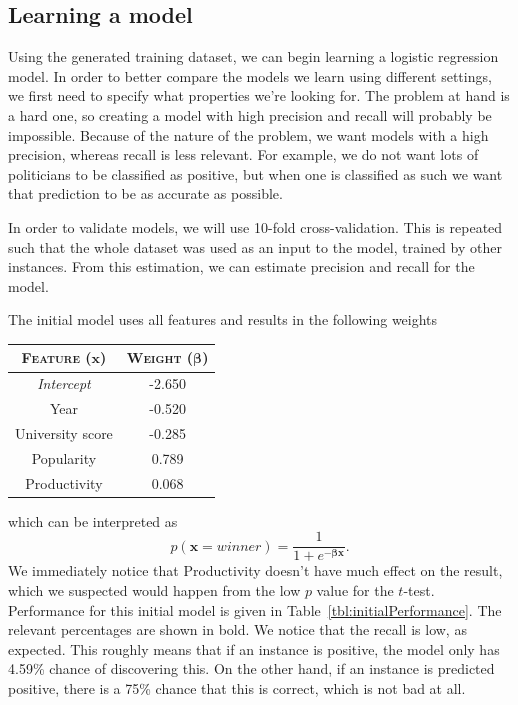 \subsection{Learning a model}
Using the generated training dataset, we can begin learning a logistic regression model. In order to better compare the models we learn using different settings, we first need to specify what properties we're looking for. The problem at hand is a hard one, so creating a model with high precision and recall will probably be impossible. Because of the nature of the problem, we want models with a high precision, whereas recall is less relevant. For example, we do not want lots of politicians to be classified as positive, but when one is classified as such we want that prediction to be as accurate as possible.

In order to validate models, we will use 10-fold cross-validation. This is repeated such that the whole dataset was used as an input to the model, trained by other instances. From this estimation, we can estimate precision and recall for the model.

The initial model uses all features and results in the following weights
\begin{table}[H]
\centering
\begin{tabular}{c|c}
\textsc{\textbf{Feature}} ($\mathbf{x}$) & \textsc{\textbf{Weight}} ($\boldsymbol{\beta}$)\\ \hline
\rule{0pt}{4mm}\emph{Intercept}&-2.650\\
Year&-0.520\\
University score&-0.285\\
Popularity&0.789\\
Productivity&0.068\\
\end{tabular}
\end{table}
\noindent which can be interpreted as 
\begin{equation*}
	p(\mathbf{x} = winner) = \frac{1}{1 + e^{-\boldsymbol{\beta}\mathbf{x}}}.
\end{equation*}
We immediately notice that Productivity doesn't have much effect on the result, which we suspected would happen from the low $p$ value for the $t$-test. Performance for this initial model is given in Table~\ref{tbl:initialPerformance}. The relevant percentages are shown in bold. We notice that the recall is low, as expected. This roughly means that if an instance is positive, the model only has 4.59\% chance of discovering this. On the other hand, if an instance is predicted positive, there is a 75\% chance that this is correct, which is not bad at all. 

